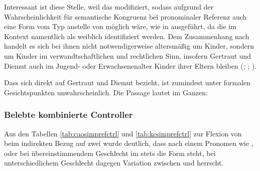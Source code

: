 Interessant ist diese Stelle, weil  das
   modifiziert, sodass
aufgrund der Wahrscheinlichkeit für semantische
Kongruenz bei pronominaler Referenz auch eine Form
vom Typ  anstelle von  möglich wäre, wie in
 ausgeführt, da die   im
Kontext namentlich als weiblich identifiziert werden. Dem Zusammenhang nach
handelt es sich bei ihnen nicht notwendigerweise altersmäßig um Kinder, sondern
um Kinder im verwandt\-schaft\-lichen und rechtlichen Sinn, insofern Gertraut
und Diemut auch im Jugend- oder Erwachsenen\-alter Kinder ihrer Eltern bleiben
(\cites(Nr.~2960)[240,31+35]{cao4};
\cites(Nr.~2719)[vgl.~auch][96,40--97,18]{cao4}; \cite[569, 619]{caor}).

Dass sich  direkt auf Gertraut und Diemut bezieht, ist
zumindest unter formalen Gesichtspunkten unwahrscheinlich. Die Passage lautet
im Ganzen:

\begin{quote}
	 \autocites(Nr.~2960)[240,37--39]{cao4}

\end{quote}


\subsubsection{Belebte kombinierte Controller}

Aus den Tabellen \ref{tab:caosimprefctrl} und \ref{tab:kcsimprefctrl} zur
Flexion von  beim indirekten Bezug auf zwei 
wurde deutlich, dass nach einem Pronomen wie  , 
 oder   bei
übereinstimmendem Geschlecht im \CAO{} stets die Form  steht, bei
unterschiedlichem Geschlecht dagegen Variation zwischen 
 und   herrscht.

